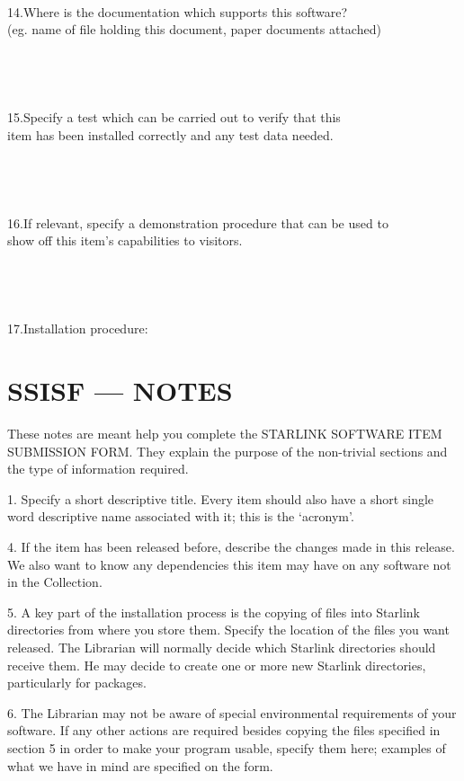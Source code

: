 \begin{tabbing}
\\
14.\>Where is the documentation which supports this software?\\
\>(eg. name of file holding this document, paper documents attached)\\
\\
\\
\\
\\
15.\>Specify a test which can be carried out to verify that this\\
\>item has been installed correctly and any test data needed.\\
\\
\\
\\
\\
16.\>If relevant, specify a demonstration procedure that can be used to\\
\>show off this item's capabilities to visitors.\\
\\
\\
\\
\\
17.\>Installation procedure:
\end{tabbing}
\newpage
\section {SSISF --- NOTES}
These notes are meant help you complete the STARLINK SOFTWARE ITEM SUBMISSION
FORM.
They explain the purpose of the non-trivial sections and the type of
information required.

1. Specify a short descriptive title.
Every item should also have a short single word descriptive name associated
with it; this is the `acronym'.

4. If the item has been released before, describe the changes made in this
release.
We also want to know any dependencies this item may have on any software not in
the Collection.

5. A key part of the installation process is the copying of files into Starlink
directories from where you store them.
Specify the location of the files you want released.
The Librarian will normally decide which Starlink directories should receive
them.
He may decide to create one or more new Starlink directories, particularly for
packages.

6. The Librarian may not be aware of special environmental requirements of
your software.
If any other actions are required besides copying the files specified in
section 5 in order to make your program usable, specify them here; examples of
what we have in mind are specified on the form.


